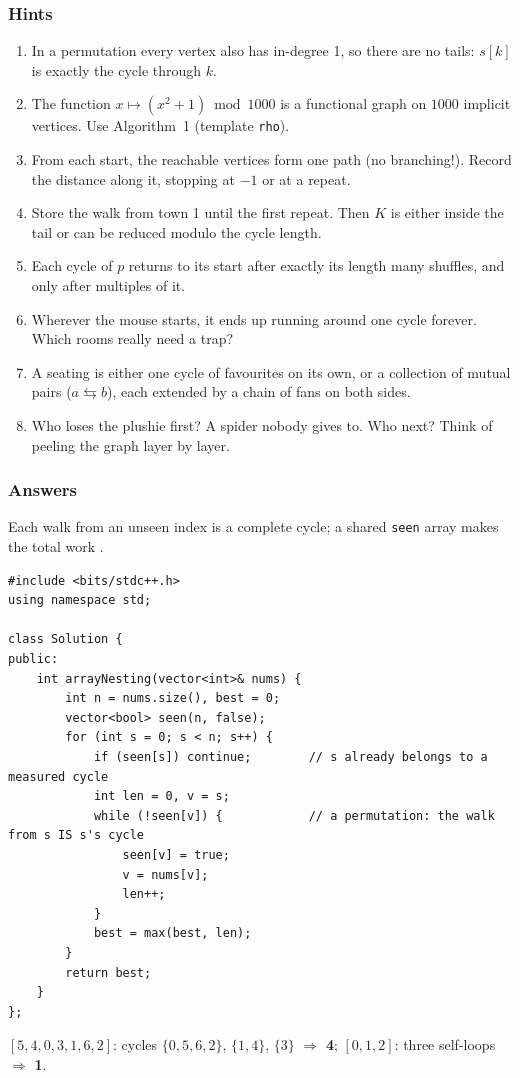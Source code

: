 \subsubsection*{Hints}
\begin{enumerate}[leftmargin=*, label=\textbf{E5.\arabic*}]
    \item In a permutation every vertex also has in-degree 1, so there are no tails: $s[k]$ is exactly the cycle through $k$.
    \item The function $x \mapsto (x^2+1) \bmod 1000$ is a functional graph on $1000$ implicit vertices. Use Algorithm~1 (template \texttt{rho}).
    \item From each start, the reachable vertices form one path (no branching!). Record the distance along it, stopping at $-1$ or at a repeat.
    \item Store the walk from town 1 until the first repeat. Then $K$ is either inside the tail or can be reduced modulo the cycle length.
    \item Each cycle of $p$ returns to its start after exactly its length many shuffles, and only after multiples of it.
    \item Wherever the mouse starts, it ends up running around one cycle forever. Which rooms really need a trap?
    \item A seating is either one cycle of favourites on its own, or a collection of mutual pairs ($a \leftrightarrows b$), each extended by a chain of fans on both sides.
    \item Who loses the plushie first? A spider nobody gives to. Who next? Think of peeling the graph layer by layer.
\end{enumerate}

\subsubsection*{Answers}

\begin{solutionbox}
Each walk from an unseen index is a complete cycle; a shared \texttt{seen} array makes the total work .
\begin{lstlisting}[style=cpp]
#include <bits/stdc++.h>
using namespace std;

class Solution {
public:
    int arrayNesting(vector<int>& nums) {
        int n = nums.size(), best = 0;
        vector<bool> seen(n, false);
        for (int s = 0; s < n; s++) {
            if (seen[s]) continue;        // s already belongs to a measured cycle
            int len = 0, v = s;
            while (!seen[v]) {            // a permutation: the walk from s IS s's cycle
                seen[v] = true;
                v = nums[v];
                len++;
            }
            best = max(best, len);
        }
        return best;
    }
};
\end{lstlisting}
$[5,4,0,3,1,6,2]$: cycles $\{0,5,6,2\}$, $\{1,4\}$, $\{3\}$ $\Rightarrow$ \textbf{4}; \;$[0,1,2]$: three self-loops $\Rightarrow$ \textbf{1}.
\end{solutionbox}

